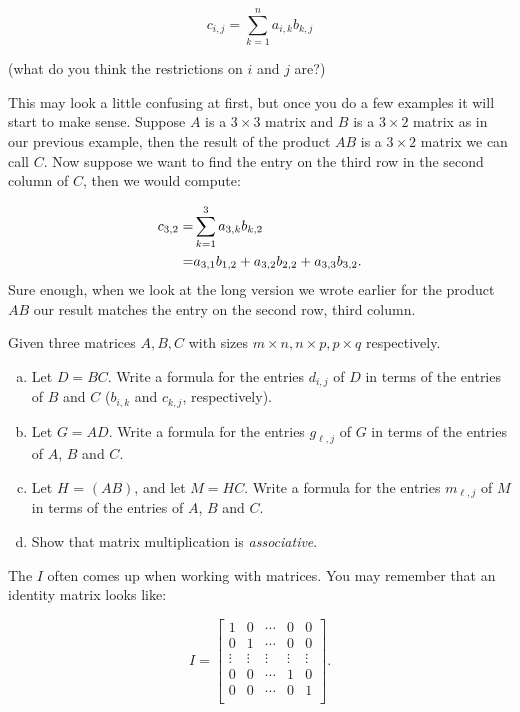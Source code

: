 \[ {c}_{i,j}= \sum_{k=1}^n a_{i,k} b_{k,j} \]

(what do you think the restrictions on $i$ and $j$ are?)

This may look a little confusing at first, but once you do a few examples it will start to make sense.  Suppose ${A}$ is a $3 \times 3$ matrix and ${B}$ is a $3 \times 2$ matrix as in our previous example, then the result of the product ${A} {B}$ is a $3 \times 2 $ matrix we can call ${C}$.  Now suppose we want to find the entry on the third row in the second column of ${C}$, then we would compute:

\begin{align}
{c}_{3,2} =& \sum_{k=1}^3 a_{3,k} b_{k,2} \notag\\
=& a_{3,1} b_{1,2} + a_{3,2} b_{2,2} + a_{3,3} b_{3,2}.  \notag
\end{align}
Sure enough, when we look at the long version we wrote earlier for the product ${AB}$ our result matches the entry on the second row, third column.

\begin{exercise}{}
Given three matrices $A, B, C$ with sizes $m \times n, n \times p, p \times q$ respectively.
\begin{enumerate}[(a)]
\item
Let $D = BC$.  Write a formula for the entries $d_{i,j}$ of $D$ in terms of the entries of $B$ and $C$ ($b_{i,k}$ and $c_{k,j}$, respectively). 
\item
Let $G = AD$.  Write a formula for the entries $g_{\ell,j}$ of $G$ in terms of the entries of $A$, $B$ and $C$.
\item
Let $H$ =  $(AB)$, and let $M = HC$. Write a formula for the entries $m_{\ell,j}$ of $M$ in terms of the entries of $A$, $B$ and $C$.
\item
Show that matrix multiplication is \emph{associative}.
\end{enumerate}
\end{exercise}

The  $I$ often comes up when working with matrices. You may remember that an identity matrix looks like:

\[I = \left[ \begin{array}{ccccc}
1 & 0  & \cdots & 0 & 0 \\
0 & 1  & \cdots & 0 & 0  \\
\vdots & \vdots & \vdots & \vdots & \vdots\\
0 & 0  & \cdots & 1 & 0  \\
0 & 0  & \cdots & 0 & 1  \\
 \end{array} \right]. \]

